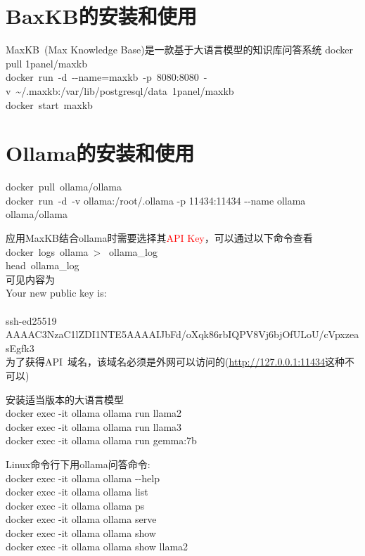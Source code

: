 \documentclass[10pt,a4paper]{article}
\begin{document}
\section{\rm{BaxKB}的安装和使用}
\textrm{MaxKB~(Max Knowledge Base)}是一款基于大语言模型的知识库问答系统
\textrm{docker pull 1panel/maxkb}\\
\textrm{docker~run~-d~-\/-name=maxkb~-p~8080:8080~-v~\sim/.maxkb:/var/lib/postgresql/data~1panel/maxkb}\\
\textrm{docker~start~maxkb}

\section{\rm{Ollama}的安装和使用}
\textrm{docker~pull~ollama/ollama}\\
\textrm{docker~run~-d~-v ollama:/root/.ollama -p 11434:11434 -\/-name ollama ollama/ollama}

应用\textrm{MaxKB}结合\textrm{ollama}时需要选择其\textcolor{red}{\textrm{API Key}}，可以通过以下命令查看\\
\textrm{docker~logs~ollama~>~ ollama\_log}\\
\textrm{head~ollama\_log}\\
可见内容为\\
\textrm{Your new public key is:\\
\\
ssh-ed25519 AAAAC3NzaC1lZDI1NTE5AAAAIJbFd/oXqk86rbIQPV8Vj6bjOfULoU/cVpxzeasEgfk3}\\

为了获得\textrm{API}~域名，该域名必须是外网可以访问的\textrm{(\url{http://127.0.0.1:11434}这种不可以)}

安装适当版本的大语言模型\\
\textrm{docker exec -it ollama ollama run llama2}\\
\textrm{docker exec -it ollama ollama run llama3}\\
\textrm{docker exec -it ollama ollama run gemma:7b} %

\textrm{Linux}命令行下用\textrm{ollama}问答命令:\\
\textrm{docker exec -it ollama ollama -\/-help}\\
\textrm{docker exec -it ollama ollama list}\\
\textrm{docker exec -it ollama ollama ps}\\
\textrm{docker exec -it ollama ollama serve}\\
\textrm{docker exec -it ollama ollama show}\\
\textrm{docker exec -it ollama ollama show llama2}
\end{document}
